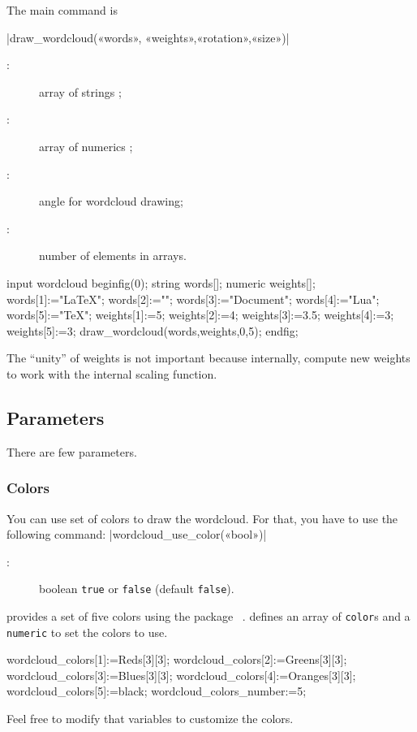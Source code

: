 \documentclass[english]{ltxdoc}
\begin{document}
The main command is 

\commande|draw_wordcloud(«words», «weights»,«rotation»,«size»)|\smallskip{}

\begin{description}
\item[:] array of strings ;
\item[:] array of numerics ;
\item[:] angle for wordcloud drawing;
\item[:] number of elements in arrays.   
\end{description}

\begin{ExempleMP}
input wordcloud
beginfig(0);
string words[];
numeric weights[];
words[1]:="\LaTeX";
words[2]:="";
words[3]:="Document";
words[4]:="Lua";
words[5]:="\TeX";
weights[1]:=5;
weights[2]:=4;
weights[3]:=3.5;
weights[4]:=3;
weights[5]:=3;
draw_wordcloud(words,weights,0,5);
endfig;
\end{ExempleMP}

\begin{remark}
The ``unity'' of weights is not important because internally,
 compute new weights to work
with the internal scaling function.  
\end{remark}

\subsection{Parameters}

There are few parameters.

\subsubsection{Colors}\label{sec:colors}

You can use set of colors to draw the wordcloud. For that, you have to use the
following command:
\commande|wordcloud_use_color(«bool»)|\smallskip{}

\begin{description}
  \item[:] boolean \lstinline+true+ or \lstinline+false+ (default \lstinline+false+). 
\end{description}

 provides a set of five colors using the 
package ~\cite{ctan-metapost-colorbrewer}.
 defines an array of \lstinline+color+s and a
\lstinline+numeric+ to set the colors to use.
\begin{mpcode}
wordcloud_colors[1]:=Reds[3][3];
wordcloud_colors[2]:=Greens[3][3];
wordcloud_colors[3]:=Blues[3][3];
wordcloud_colors[4]:=Oranges[3][3];
wordcloud_colors[5]:=black;
wordcloud_colors_number:=5;
\end{mpcode} 
Feel free to modify that variables to customize the colors.
\end{document}
